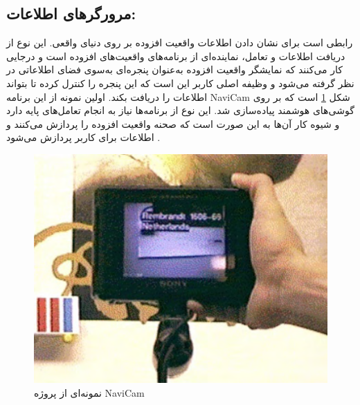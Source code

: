\subsection{مرورگرهای اطلاعات\protect{}: }رابطی است برای نشان دادن اطلاعات واقعیت افزوده بر روی دنیای واقعی. این نوع از دریافت اطلاعات و تعامل، نماینده‌ای از برنامه‌های واقعیت‌های افزوده است و درجایی کار می‌کنند که نمایشگر واقعیت افزوده به‌عنوان پنجره‌ای به‌سوی فضای اطلاعاتی در نظر گرفته می‌شود و وظیفه اصلی کاربر این است که این پنجره را کنترل کرده تا بتواند اطلاعات را دریافت بکند. اولین نمونه از این برنامه NaviCam شکل \ref{fig:Rekimoto} است که بر روی گوشی‌های هوشمند پیاده‌سازی شد. این نوع از برنامه‌ها نیاز به انجام تعامل‌های پایه دارد و شیوه کار آن‌ها به این صورت است که صحنه واقعیت افزوده را پردازش می‌کنند و اطلاعات برای کاربر پردازش می‌شود \cite{Rekimoto}.
\begin{figure}[tb]
	\centering
	\includegraphics[width=0.6\linewidth]{image/navicam}
	\caption {نمونه‌ای از پروژه NaviCam\cite{Rekimoto}}
	\label{fig:Rekimoto}
\end{figure}
